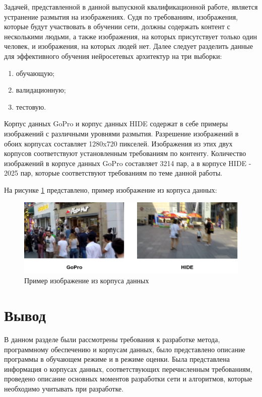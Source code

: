 Задачей, представленной в данной выпускной квалификационной работе, является устранение размытия на изображениях. Судя по требованиям, изображения, которые будут участвовать в обучении сети, должны содержать контент с несколькими людьми, а также изображения, на которых присутствует только один человек, и изображения, на которых людей нет. Далее следует разделить данные для эффективного обучения нейросетевых архитектур на три выборки:
\begin{enumerate}[left=0.49cm]
    \item обучающую;
    \item валидационную;
    \item тестовую.
\end{enumerate}

Корпус данных GoPro \cite{nah2017deep} и корпус данных HIDE \cite{shen2019human} содержат в себе примеры изображений с различными уровнями размытия. Разрешение изображений в обоих корпусах составляет 1280x720 пикселей. Изображения из этих двух корпусов соответствуют установленным требованиям по контенту. Количество изображений в корпусе данных GoPro составляет 3214 пар, а в корпусе HIDE - 2025 пар, которые соответствуют требованиям по теме данной работы.

На рисунке \ref{fig:dataset-example} представлено, пример изображение из корпуса данных:
\begin{figure}[H]
	\centering
	\includegraphics[width=0.75\linewidth]{assets/dataset-example.png}
	\caption{Пример изображение из корпуса данных}
	\label{fig:dataset-example}
\end{figure}

\section*{Вывод}

В данном разделе были рассмотрены требования к разработке метода, программному обеспечению и корпусам данных, было представлено описание программы в обучающем режиме и в режиме оценки. Была представлена информация о корпусах данных, соответствующих перечисленным требованиям, проведено описание основных моментов разработки сети и алгоритмов, которые необходимо учитывать при разработке.